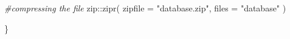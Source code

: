 \documentclass[
  table]{article}
\newenvironment{Shaded}{\begin{snugshade}}{\end{snugshade}}
\newcommand{\AttributeTok}[1]{\textcolor[rgb]{0.77,0.63,0.00}{#1}}
\newcommand{\CommentTok}[1]{\textcolor[rgb]{0.56,0.35,0.01}{\textit{#1}}}
\newcommand{\FunctionTok}[1]{\textcolor[rgb]{0.00,0.00,0.00}{#1}}
\newcommand{\NormalTok}[1]{#1}
\newcommand{\SpecialCharTok}[1]{\textcolor[rgb]{0.00,0.00,0.00}{#1}}
\newcommand{\StringTok}[1]{\textcolor[rgb]{0.31,0.60,0.02}{#1}}
\begin{document}
\begin{Shaded}
\begin{Highlighting}[]
  \CommentTok{\#compressing the file}
\NormalTok{  zip}\SpecialCharTok{::}\FunctionTok{zipr}\NormalTok{(}
    \AttributeTok{zipfile =} \StringTok{"database.zip"}\NormalTok{,}
    \AttributeTok{files =} \StringTok{"database"}
\NormalTok{  )}
  
\NormalTok{\}}
\end{Highlighting}
\end{Shaded}
\end{document}
